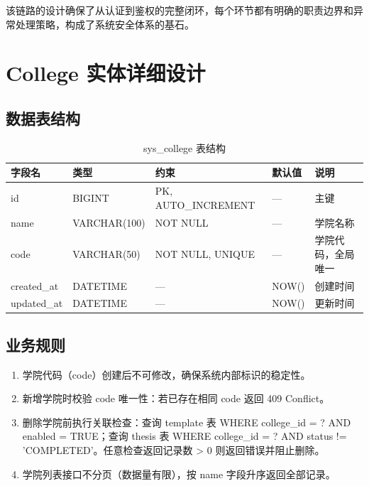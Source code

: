 \documentclass{../softeng}
\begin{document}
该链路的设计确保了从认证到鉴权的完整闭环，每个环节都有明确的职责边界和异常处理策略，构成了系统安全体系的基石。

\section{College 实体详细设计}

\subsection{数据表结构}

\begin{table}[htbp]
\centering
\caption{sys\_college 表结构}
\begin{tabular}{lllll}
\toprule
\textbf{字段名} & \textbf{类型} & \textbf{约束} & \textbf{默认值} & \textbf{说明} \\
\midrule
id        & BIGINT  & PK, AUTO\_INCREMENT & —      & 主键 \\
name      & VARCHAR(100) & NOT NULL        & —      & 学院名称 \\
code      & VARCHAR(50)  & NOT NULL, UNIQUE & —      & 学院代码，全局唯一 \\
created\_at & DATETIME & —              & NOW()  & 创建时间 \\
updated\_at & DATETIME & —              & NOW()  & 更新时间 \\
\bottomrule
\end{tabular}
\end{table}

\subsection{业务规则}

\begin{enumerate}
    \item 学院代码（code）创建后不可修改，确保系统内部标识的稳定性。
    \item 新增学院时校验 code 唯一性：若已存在相同 code 返回 409 Conflict。
    \item 删除学院前执行关联检查：查询 template 表 WHERE college\_id = ? AND enabled = TRUE；查询 thesis 表 WHERE college\_id = ? AND status != 'COMPLETED'。任意检查返回记录数 > 0 则返回错误并阻止删除。
    \item 学院列表接口不分页（数据量有限），按 name 字段升序返回全部记录。
\end{enumerate}
\end{document}
